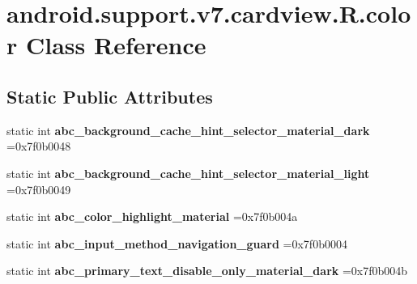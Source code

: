 \hypertarget{classandroid_1_1support_1_1v7_1_1cardview_1_1R_1_1color}{}\section{android.\+support.\+v7.\+cardview.\+R.\+color Class Reference}
\label{classandroid_1_1support_1_1v7_1_1cardview_1_1R_1_1color}
\subsection*{Static Public Attributes}
\begin{DoxyCompactItemize}
\item 
\mbox{\label{classandroid_1_1support_1_1v7_1_1cardview_1_1R_1_1color_a925140eafc820e27000c7c39ebfd42fe}} 
static int {\bfseries abc\+\_\+background\+\_\+cache\+\_\+hint\+\_\+selector\+\_\+material\+\_\+dark} =0x7f0b0048
\item 
\mbox{\label{classandroid_1_1support_1_1v7_1_1cardview_1_1R_1_1color_aab123ddc6677f1269791117c6adca97f}} 
static int {\bfseries abc\+\_\+background\+\_\+cache\+\_\+hint\+\_\+selector\+\_\+material\+\_\+light} =0x7f0b0049
\item 
\mbox{\label{classandroid_1_1support_1_1v7_1_1cardview_1_1R_1_1color_a823e51d6996e8874344f40e4fed66913}} 
static int {\bfseries abc\+\_\+color\+\_\+highlight\+\_\+material} =0x7f0b004a
\item 
\mbox{\label{classandroid_1_1support_1_1v7_1_1cardview_1_1R_1_1color_aac746a44233e3c6654b9c993d1da207a}} 
static int {\bfseries abc\+\_\+input\+\_\+method\+\_\+navigation\+\_\+guard} =0x7f0b0004
\item 
\mbox{\label{classandroid_1_1support_1_1v7_1_1cardview_1_1R_1_1color_a1f974ebb98029266a4dcc92edbca8d54}} 
static int {\bfseries abc\+\_\+primary\+\_\+text\+\_\+disable\+\_\+only\+\_\+material\+\_\+dark} =0x7f0b004b
\item 
\mbox{\label{classandroid_1_1support_1_1v7_1_1cardview_1_1R_1_1color_afc289111b98c22c57dc9bc39ef00fd05}} 

\end{DoxyCompactItemize}
